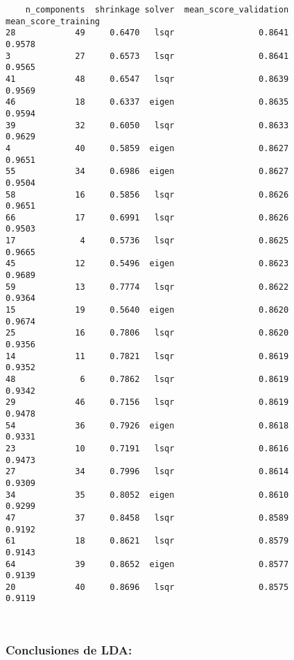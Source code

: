 \documentclass[11pt]{article}
\begin{document}
    
    \begin{verbatim}
    n_components  shrinkage solver  mean_score_validation  mean_score_training
28            49     0.6470   lsqr                 0.8641               0.9578
3             27     0.6573   lsqr                 0.8641               0.9565
41            48     0.6547   lsqr                 0.8639               0.9569
46            18     0.6337  eigen                 0.8635               0.9594
39            32     0.6050   lsqr                 0.8633               0.9629
4             40     0.5859  eigen                 0.8627               0.9651
55            34     0.6986  eigen                 0.8627               0.9504
58            16     0.5856   lsqr                 0.8626               0.9651
66            17     0.6991   lsqr                 0.8626               0.9503
17             4     0.5736   lsqr                 0.8625               0.9665
45            12     0.5496  eigen                 0.8623               0.9689
59            13     0.7774   lsqr                 0.8622               0.9364
15            19     0.5640  eigen                 0.8620               0.9674
25            16     0.7806   lsqr                 0.8620               0.9356
14            11     0.7821   lsqr                 0.8619               0.9352
48             6     0.7862   lsqr                 0.8619               0.9342
29            46     0.7156   lsqr                 0.8619               0.9478
54            36     0.7926  eigen                 0.8618               0.9331
23            10     0.7191   lsqr                 0.8616               0.9473
27            34     0.7996   lsqr                 0.8614               0.9309
34            35     0.8052  eigen                 0.8610               0.9299
47            37     0.8458   lsqr                 0.8589               0.9192
61            18     0.8621   lsqr                 0.8579               0.9143
64            39     0.8652  eigen                 0.8577               0.9139
20            40     0.8696   lsqr                 0.8575               0.9119
    \end{verbatim}

    
    \begin{Verbatim}[commandchars=\\\{\}]
 

    \end{Verbatim}

    \subsubsection{Conclusiones de LDA:}\label{conclusiones-de-lda}
\end{document}
